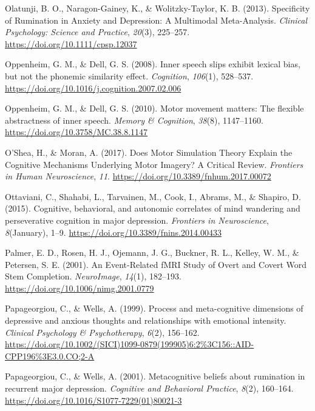 \documentclass[a4paper,12pt,twoside,openright,oldfontcommands]{memoir}
\begin{document}
\leavevmode\hypertarget{ref-olatunji_specificity_2013}{}%
Olatunji, B. O., Naragon-Gainey, K., \& Wolitzky-Taylor, K. B. (2013). Specificity of Rumination in Anxiety and Depression: A Multimodal Meta-Analysis. \emph{Clinical Psychology: Science and Practice}, \emph{20}(3), 225--257. \url{https://doi.org/10.1111/cpsp.12037}

\leavevmode\hypertarget{ref-oppenheim_inner_2008}{}%
Oppenheim, G. M., \& Dell, G. S. (2008). Inner speech slips exhibit lexical bias, but not the phonemic similarity effect. \emph{Cognition}, \emph{106}(1), 528--537. \url{https://doi.org/10.1016/j.cognition.2007.02.006}

\leavevmode\hypertarget{ref-oppenheim_motor_2010}{}%
Oppenheim, G. M., \& Dell, G. S. (2010). Motor movement matters: The flexible abstractness of inner speech. \emph{Memory \& Cognition}, \emph{38}(8), 1147--1160. \url{https://doi.org/10.3758/MC.38.8.1147}

\leavevmode\hypertarget{ref-oshea_does_2017}{}%
O'Shea, H., \& Moran, A. (2017). Does Motor Simulation Theory Explain the Cognitive Mechanisms Underlying Motor Imagery? A Critical Review. \emph{Frontiers in Human Neuroscience}, \emph{11}. \url{https://doi.org/10.3389/fnhum.2017.00072}

\leavevmode\hypertarget{ref-Ottaviani2015}{}%
Ottaviani, C., Shahabi, L., Tarvainen, M., Cook, I., Abrams, M., \& Shapiro, D. (2015). Cognitive, behavioral, and autonomic correlates of mind wandering and perseverative cognition in major depression. \emph{Frontiers in Neuroscience}, \emph{8}(January), 1--9. \url{https://doi.org/10.3389/fnins.2014.00433}

\leavevmode\hypertarget{ref-palmer_event-related_2001}{}%
Palmer, E. D., Rosen, H. J., Ojemann, J. G., Buckner, R. L., Kelley, W. M., \& Petersen, S. E. (2001). An Event-Related fMRI Study of Overt and Covert Word Stem Completion. \emph{NeuroImage}, \emph{14}(1), 182--193. \url{https://doi.org/10.1006/nimg.2001.0779}

\leavevmode\hypertarget{ref-papageorgiou_process_1999}{}%
Papageorgiou, C., \& Wells, A. (1999). Process and meta-cognitive dimensions of depressive and anxious thoughts and relationships with emotional intensity. \emph{Clinical Psychology \& Psychotherapy}, \emph{6}(2), 156--162. \url{https://doi.org/10.1002/(SICI)1099-0879(199905)6:2\%3C156::AID-CPP196\%3E3.0.CO;2-A}

\leavevmode\hypertarget{ref-papageorgiou_metacognitive_2001}{}%
Papageorgiou, C., \& Wells, A. (2001). Metacognitive beliefs about rumination in recurrent major depression. \emph{Cognitive and Behavioral Practice}, \emph{8}(2), 160--164. \url{https://doi.org/10.1016/S1077-7229(01)80021-3}
\end{document}
